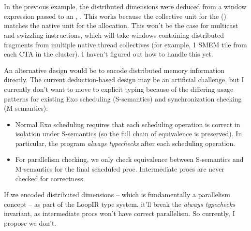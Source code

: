 \\
\\
\\
\\
\\
\\
\\

\filbreak
{}

In the previous example, the distributed dimensions were deduced from a window expression passed to an , .
This works because the collective unit for the  () matches the native unit for the allocation.
This won't be the case for multicast and swizzling instructions, which will take windows containing distributed fragments from multiple native thread collectives (for example, 1 SMEM tile from each CTA in the cluster).
I haven't figured out how to handle this yet.

An alternative design would be to encode distributed memory information directly.
The current deduction-based design may be an artificial challenge, but I currently don't want to move to explicit typing because of the differing usage patterns for existing Exo scheduling (S-semantics) and synchronization checking (M-semantics):
\begin{itemize}
  \item Normal Exo scheduling requires that each scheduling operation is correct in isolation under S-semantics (so the full chain of equivalence is preserved). In particular, the program \textit{always typechecks} after each scheduling operation.
  \item For parallelism checking, we only check equivalence between S-semantics and M-semantics for the final scheduled proc. Intermediate procs are never checked for correctness.
\end{itemize}
If we encoded distributed dimensions -- which is fundamentally a parallelism concept -- as part of the LoopIR type system, it'll break the \textit{always typechecks} invariant, as intermediate procs won't have correct parallelism.
So currently, I propose we don't.

